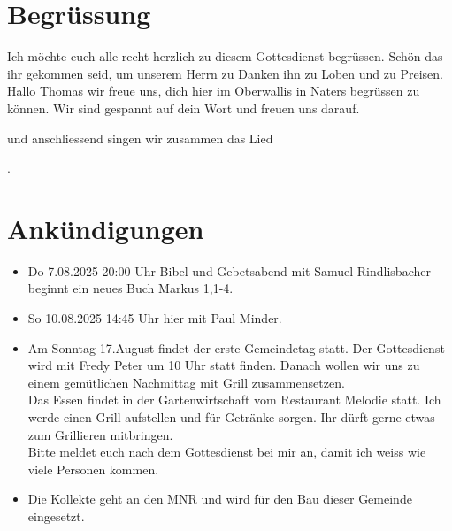 \documentclass{../../inc/mybib}
\begin{document}
\section{Begrüssung}

Ich möchte euch alle recht herzlich zu diesem Gottesdienst begrüssen. Schön das ihr gekommen seid, um unserem Herrn zu Danken ihn zu Loben und zu Preisen.
Hallo Thomas wir freue uns, dich hier im Oberwallis in Naters begrüssen zu können. Wir sind gespannt auf dein Wort und freuen uns darauf.

\beten{} und anschliessend singen wir zusammen das Lied

{}.

\section{Ankündigungen}
\begin{itemize}
    \item {} Do 7.08.2025 20:00 Uhr Bibel und Gebetsabend mit Samuel Rindlisbacher  beginnt ein neues Buch Markus 1,1-4.
    \item {} So 10.08.2025 14:45 Uhr hier mit Paul Minder.
    \item {} Am Sonntag 17.August findet der erste Gemeindetag statt. Der Gottesdienst wird mit Fredy Peter um 10 Uhr statt finden. Danach wollen wir uns zu einem gemütlichen Nachmittag mit Grill zusammensetzen.\\    
    Das Essen findet in der Gartenwirtschaft vom Restaurant Melodie statt. Ich werde einen Grill aufstellen und für Getränke sorgen. Ihr dürft gerne etwas zum Grillieren mitbringen.\\
    Bitte meldet euch nach dem Gottesdienst bei mir an, damit ich weiss wie viele Personen kommen.\\
    \item {} Die Kollekte geht an den MNR und wird für den Bau dieser Gemeinde eingesetzt.
\end{itemize}
\end{document}
